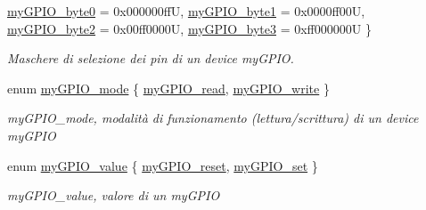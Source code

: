 \begin{DoxyCompactItemize}
\hyperlink{group__bare-metal_gga402a0d20afc0cb7c25554b8b023f4253a0347b1742eef6b2575a7d409c7fb5c3d}{my\+G\+P\+I\+O\+\_\+byte0} = 0x000000ffU, 
\hyperlink{group__bare-metal_gga402a0d20afc0cb7c25554b8b023f4253ae5aec65fa20f554b893e419fc2755fd0}{my\+G\+P\+I\+O\+\_\+byte1} = 0x0000ff00U, 
\hyperlink{group__bare-metal_gga402a0d20afc0cb7c25554b8b023f4253af4892f7db28c64a7cf2a7236c88b742b}{my\+G\+P\+I\+O\+\_\+byte2} = 0x00ff0000U, 
\hyperlink{group__bare-metal_gga402a0d20afc0cb7c25554b8b023f4253a1ceefb9d65397352e986c573984d0129}{my\+G\+P\+I\+O\+\_\+byte3} = 0xff000000U
 \}\begin{DoxyCompactList}\small\item\em Maschere di selezione dei pin di un device my\+G\+P\+IO. \end{DoxyCompactList}
\item 
enum \hyperlink{group__bare-metal_ga76b849f0e0c05e7f9161bdb33396f2b1}{my\+G\+P\+I\+O\+\_\+mode} \{ \hyperlink{group__bare-metal_gga76b849f0e0c05e7f9161bdb33396f2b1a1e6dc78e7641e878cadc842d39605d5d}{my\+G\+P\+I\+O\+\_\+read}, 
\hyperlink{group__bare-metal_gga76b849f0e0c05e7f9161bdb33396f2b1a2d66976280eb7595a42c631683bdfad6}{my\+G\+P\+I\+O\+\_\+write}
 \}\begin{DoxyCompactList}\small\item\em my\+G\+P\+I\+O\+\_\+mode, modalità di funzionamento (lettura/scrittura) di un device my\+G\+P\+IO \end{DoxyCompactList}
\item 
enum \hyperlink{group__bare-metal_gaf634fe4a0e1eab8da5000b72d6ad362b}{my\+G\+P\+I\+O\+\_\+value} \{ \hyperlink{group__bare-metal_ggaf634fe4a0e1eab8da5000b72d6ad362ba98cde80dbda025bd1ae7231c76b55674}{my\+G\+P\+I\+O\+\_\+reset}, 
\hyperlink{group__bare-metal_ggaf634fe4a0e1eab8da5000b72d6ad362ba10d296f3711d01189cc6c2d87f7c9149}{my\+G\+P\+I\+O\+\_\+set}
 \}\begin{DoxyCompactList}\small\item\em my\+G\+P\+I\+O\+\_\+value, valore di un my\+G\+P\+IO \end{DoxyCompactList}
\end{DoxyCompactItemize}
